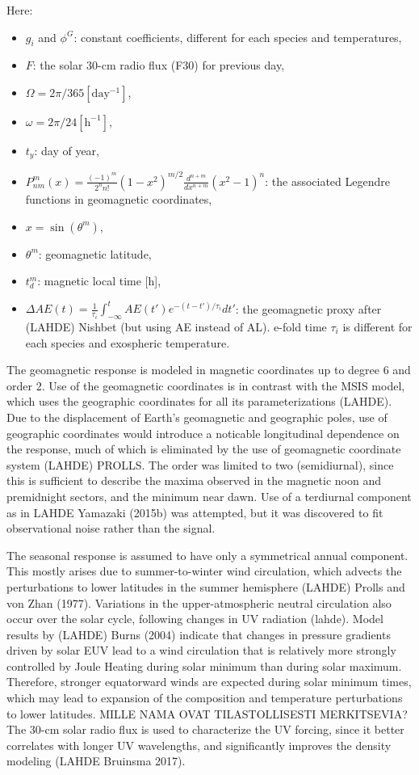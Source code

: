 \documentclass[referee,a4paper,12pt,traditabstract]{swsc}
\begin{document}
\begin{linenumbers}
Here:
\begin{itemize}
\item $g_i$ and $\phi^G$: constant coefficients, different for each species and temperatures,
\item $F$: the solar 30-cm radio flux (F30) for previous day,
\item $\Omega = 2\pi / 365 \mathrm{[day^{-1}]}$,
\item $\omega = 2\pi / 24 \mathrm{[h^{-1}]}$,
\item $t_y$: day of year,
\item $P^m_{nm}(x) = \frac{(-1)^m}{2^n n!} (1-x^2)^{m/2} \frac{d^{n+m}}{d x^{n+m}} (x^2 - 1)^n$: the associated Legendre functions in geomagnetic coordinates,
\item $x = \sin(\theta^m)$,
\item $\theta^m$: geomagnetic latitude,
\item $t^m_d$: magnetic local time [h],
\item $\Delta AE (t) = \frac{1}{\tau_i} \int_{-\infty}^{t} AE(t') e^{-(t-t')/\tau_i}dt'$: the geomagnetic proxy after (LAHDE) Nishbet (but using AE instead of AL). e-fold time $\tau_i$ is different for each species and exospheric temperature.
\end{itemize}

The geomagnetic response is modeled in magnetic coordinates up to degree 6 and order 2. Use of the geomagnetic coordinates is in contrast with the MSIS model, which uses the geographic coordinates for all its parameterizations (LAHDE). Due to the displacement of Earth's geomagnetic and geographic poles, use of geographic coordinates would introduce a noticable longitudinal dependence on the response, much of which is eliminated by the use of geomagnetic coordinate system (LAHDE) PROLLS. The order was limited to two (semidiurnal), since this is sufficient to describe the maxima observed in the magnetic noon and premidnight sectors, and the minimum near dawn. Use of a terdiurnal component as in LAHDE Yamazaki (2015b) was attempted, but it was discovered to fit observational noise rather than the signal. 

The seasonal response is assumed to have only a symmetrical annual component. This mostly arises due to summer-to-winter wind circulation, which advects the perturbations to lower latitudes in the summer hemisphere (LAHDE) Prolls and von Zhan (1977). Variations in the upper-atmospheric neutral circulation also occur over the solar cycle, following changes in UV radiation (lahde). Model results by (LAHDE) Burns (2004) indicate that changes in pressure gradients driven by solar EUV lead to a wind circulation that is relatively more strongly controlled by Joule Heating during solar minimum than during solar maximum. Therefore, stronger equatorward winds are expected during solar minimum times, which may lead to expansion of the composition and temperature perturbations to lower latitudes. MILLE NAMA OVAT TILASTOLLISESTI MERKITSEVIA? The 30-cm solar radio flux is used to characterize the UV forcing, since it better correlates with longer UV wavelengths, and significantly improves the density modeling (LAHDE Bruinsma 2017). 


\end{linenumbers}
\end{document}
